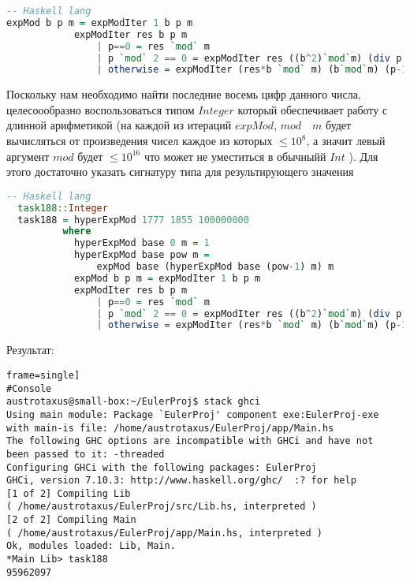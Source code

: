 \documentclass[11pt,a4paper]{article}
\begin{document}
\begin{lstlisting}[language=Haskell, frame=single]
-- Haskell lang
expMod b p m = expModIter 1 b p m
            expModIter res b p m
                | p==0 = res `mod` m
                | p `mod` 2 == 0 = expModIter res ((b^2)`mod`m) (div p 2) m
                | otherwise = expModIter (res*b `mod` m) (b`mod`m) (p-1) m
\end{lstlisting}

Поскольку нам необходимо найти последние восемь цифр данного числа, целесоообразно воспользоваться типом $Integer$ который обеспечивает работу с длинной арифметикой (на каждой из итераций $expMod$, $mod \quad m$ будет вычисляться от произведения чисел каждое из которых $\le  10^8$, а значит левый аргумент $mod$ будет $\le  10^{16}$ что может не уместиться в обычныйй $Int$ ). Для этого достаточно указать сигнатуру типа для результирующего значения
\begin{lstlisting}[language=Haskell, frame=single]
  -- Haskell lang
  task188::Integer
  task188 = hyperExpMod 1777 1855 100000000
          where
            hyperExpMod base 0 m = 1
            hyperExpMod base pow m =
                expMod base (hyperExpMod base (pow-1) m) m
            expMod b p m = expModIter 1 b p m
            expModIter res b p m
                | p==0 = res `mod` m
                | p `mod` 2 == 0 = expModIter res ((b^2)`mod`m) (div p 2) m
                | otherwise = expModIter (res*b `mod` m) (b`mod`m) (p-1) m

\end{lstlisting}
Результат:
\begin{lstlisting}frame=single]
#Console
austrotaxus@small-box:~/EulerProj$ stack ghci
Using main module: Package `EulerProj' component exe:EulerProj-exe
with main-is file: /home/austrotaxus/EulerProj/app/Main.hs
The following GHC options are incompatible with GHCi and have not
been passed to it: -threaded
Configuring GHCi with the following packages: EulerProj
GHCi, version 7.10.3: http://www.haskell.org/ghc/  :? for help
[1 of 2] Compiling Lib
( /home/austrotaxus/EulerProj/src/Lib.hs, interpreted )
[2 of 2] Compiling Main
( /home/austrotaxus/EulerProj/app/Main.hs, interpreted )
Ok, modules loaded: Lib, Main. 
*Main Lib> task188
95962097
\end{lstlisting}
\end{document}
